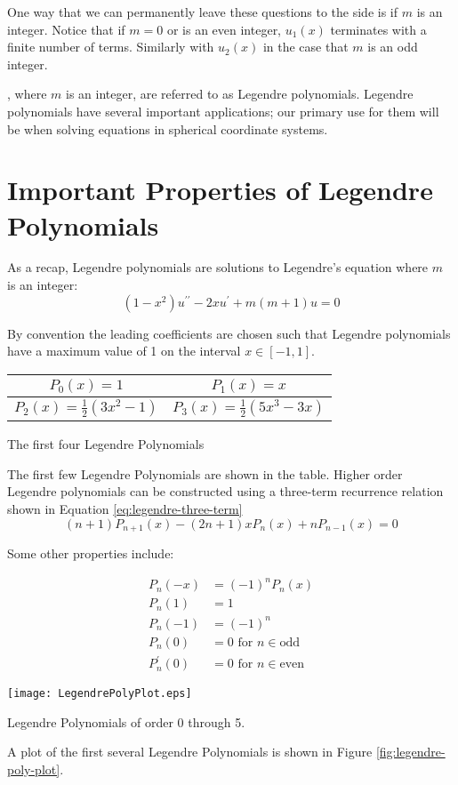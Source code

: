 One way that we can permanently leave these questions to the side is if $m$ is an integer.  Notice that if $m=0$ or is an even integer, $u_1(x)$ terminates with a finite number of terms. Similarly with $u_2(x)$ in the case that $m$ is an odd integer. 

, where $m$ is an integer, are referred to as Legendre polynomials.  Legendre polynomials have several important applications; our primary use for them will be when solving equations in spherical coordinate systems.

\section{Important Properties of Legendre Polynomials}
As a recap, Legendre polynomials are solutions to Legendre's equation where $m$ is an integer:
\begin{equation*}
\left(1-x^2 \right)u^{\prime \prime} - 2xu^{\prime} + m(m+1)u = 0
\end{equation*}

By convention the leading coefficients are chosen such that Legendre polynomials have a maximum value of 1 on the interval $x\in[-1,1]$.  

\begin{margintable}
\begin{tabular}{c | c}
$P_0(x) = 1$ & $P_1(x) = x$ \\\hline
$P_2(x) = \frac{1}{2}(3x^2-1)$ & $P_3(x) = \frac{1}{2}(5x^3-3x)$ \\
\end{tabular}
\label{tab:Legendre-poly}
\caption{The first four Legendre Polynomials}
\end{margintable}
The first few Legendre Polynomials are shown in the table. Higher order Legendre polynomials can be constructed using a three-term recurrence relation shown in Equation \ref{eq:legendre-three-term}
\begin{equation}
(n+1)P_{n+1}(x) - (2n+1)xP_n(x) + nP_{n-1}(x) = 0
\label{eq:legendre-three-term}
\end{equation}

\vspace{4.0cm}

Some other properties include:

\begin{align*}
P_n(-x) &= (-1)^nP_n(x) \\
P_n(1) &= 1 \\
P_n(-1) &= (-1)^n \\
P_n(0) &= 0 \text{ for } n\in{\text{odd}} \\
P_n^{\prime}(0) &=0 \text{ for } n\in{\text{even}}
\end{align*}
\begin{marginfigure}
\texttt{[image: LegendrePolyPlot.eps]}
\caption{Legendre Polynomials of order 0 through 5.}
\label{fig:legendre-poly-plot}
\end{marginfigure}
A plot of the first several Legendre Polynomials is shown in Figure \ref{fig:legendre-poly-plot}.


